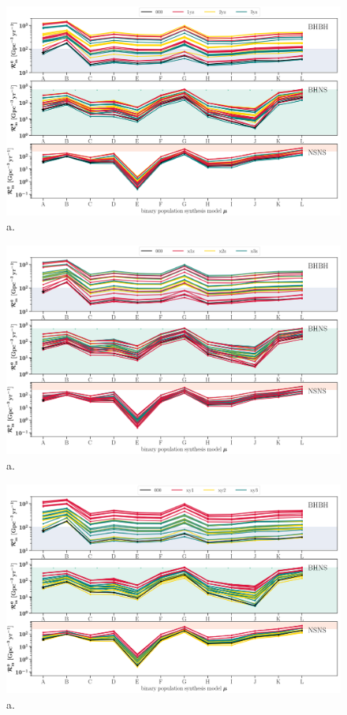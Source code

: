 \documentclass[twocolumn]{aastex63}
\begin{document}
\begin{figure}
    \centering
\includegraphics[width=.8\textwidth]{../PlottingScripts/8_PredictedRates_BPS_and_MSSFR_variations/Rates_intrinsic_SFR_.png} %
    \caption{a. }%
    \label{fig:IntrinsicRatesApp_SFR}
\end{figure}
%
\begin{figure}
    \centering
\includegraphics[width=.8\textwidth]{../PlottingScripts/8_PredictedRates_BPS_and_MSSFR_variations/Rates_intrinsic_GSMF_.png} %
    \caption{a. }%
    \label{fig:IntrinsicRatesApp_GSMF}
\end{figure}
%


\begin{figure}
    \centering
\includegraphics[width=.8\textwidth]{../PlottingScripts/8_PredictedRates_BPS_and_MSSFR_variations/Rates_intrinsic_MZR_.png} %
    \caption{a. }%
    \label{fig:IntrinsicRatesApp_MZR}
\end{figure}
%
\end{document}
